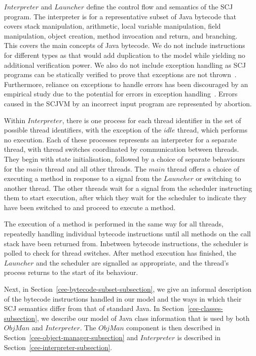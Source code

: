 $Interpreter$ and $Launcher$ define the control flow and semantics of
the SCJ program.
The interpreter is for a representative subset of Java bytecode that
covers stack manipulation, arithmetic, local variable manipulation,
field manipulation, object creation, method invocation and return, and
branching. 
This covers the main concepts of Java bytecode.
We do not include instructions for different types as that would add
duplication to the model while yielding no additional verification
power. 
We also do not include exception handling as SCJ programs can be
statically verified to prove that exceptions are not
thrown~\cite{kalibera2010,marriott2014}. 
Furthermore, reliance on exceptions to handle errors has been
discouraged by an empirical study due to the potential for errors in
exception handling~\cite{sawadpong2012}. 
Errors caused in the SCJVM by an incorrect input program are
represented by abortion.

Within $Interpreter$, there is one process for each thread identifier
in the set of possible thread identifiers, with the exception of the
$idle$ thread, which performs no execution.
Each of these processes represents an interpreter for a separate
thread, with thread switches coordinated by communication between
threads.
They begin with state initialisation, followed by a choice of separate
behaviours for the $main$ thread and all other threads.
The $main$ thread offers a choice of executing a method in response to
a signal from the $Launcher$ or switching to another thread.
The other threads wait for a signal from the scheduler instructing
them to start execution, after which they wait for the scheduler to
indicate they have been switched to and proceed to execute a method.

The execution of a method is performed in the same way for all
threads, repeatedly handling individual bytecode instructions until
all methods on the call stack have been returned from.
Inbetween bytecode instructions, the scheduler is polled to check for
thread switches.
After method execution has finished, the $Launcher$ and the scheduler
are signalled as appropriate, and the thread's process returns to the
start of its behaviour.

Next, in Section~\ref{cee-bytecode-subset-subsection}, we give an
informal description of the bytecode instructions handled in our model
and the ways in which their SCJ semantics differ from that of standard
Java.
In Section~\ref{cee-classes-subsection}, we describe our model of Java
class information that is used by both $ObjMan$ and $Interpreter$.
The $ObjMan$ component is then described in
Section~\ref{cee-object-manager-subsection} and $Interpreter$ is
described in Section~\ref{cee-interpreter-subsection}.

